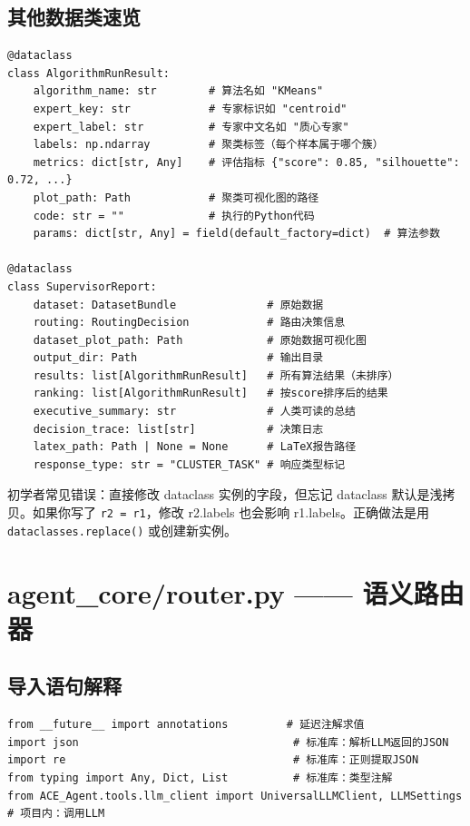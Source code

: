 \documentclass[11pt,a4paper]{ctexbook}
\begin{document}
\subsection{其他数据类速览}

\begin{verbatim}
@dataclass
class AlgorithmRunResult:
    algorithm_name: str        # 算法名如 "KMeans"
    expert_key: str            # 专家标识如 "centroid"
    expert_label: str          # 专家中文名如 "质心专家"
    labels: np.ndarray         # 聚类标签（每个样本属于哪个簇）
    metrics: dict[str, Any]    # 评估指标 {"score": 0.85, "silhouette": 0.72, ...}
    plot_path: Path            # 聚类可视化图的路径
    code: str = ""             # 执行的Python代码
    params: dict[str, Any] = field(default_factory=dict)  # 算法参数

@dataclass
class SupervisorReport:
    dataset: DatasetBundle              # 原始数据
    routing: RoutingDecision            # 路由决策信息
    dataset_plot_path: Path             # 原始数据可视化图
    output_dir: Path                    # 输出目录
    results: list[AlgorithmRunResult]   # 所有算法结果（未排序）
    ranking: list[AlgorithmRunResult]   # 按score排序后的结果
    executive_summary: str              # 人类可读的总结
    decision_trace: list[str]           # 决策日志
    latex_path: Path | None = None      # LaTeX报告路径
    response_type: str = "CLUSTER_TASK" # 响应类型标记
\end{verbatim}

\begin{notebox}
    初学者常见错误：直接修改 dataclass 实例的字段，但忘记 dataclass 默认是浅拷贝。如果你写了 \texttt{r2 = r1}，修改 r2.labels 也会影响 r1.labels。正确做法是用 \texttt{dataclasses.replace()} 或创建新实例。
\end{notebox}

\section{agent\_core/router.py —— 语义路由器}

\subsection{导入语句解释}

\begin{verbatim}
from __future__ import annotations         # 延迟注解求值
import json                                 # 标准库：解析LLM返回的JSON
import re                                   # 标准库：正则提取JSON
from typing import Any, Dict, List          # 标准库：类型注解
from ACE_Agent.tools.llm_client import UniversalLLMClient, LLMSettings  # 项目内：调用LLM
\end{verbatim}
\end{document}

